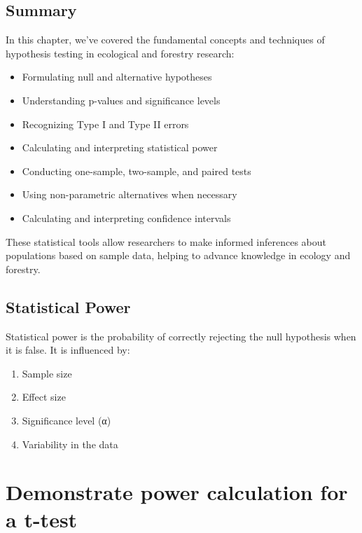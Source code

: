 \documentclass[
  letterpaper,
]{book}
\providecommand{\tightlist}{%
  \setlength{\itemsep}{0pt}\setlength{\parskip}{0pt}}
\begin{document}
\section{Summary}\label{summary-3}

In this chapter, we've covered the fundamental concepts and techniques
of hypothesis testing in ecological and forestry research:

\begin{itemize}
\tightlist
\item
  Formulating null and alternative hypotheses
\item
  Understanding p-values and significance levels
\item
  Recognizing Type I and Type II errors
\item
  Calculating and interpreting statistical power
\item
  Conducting one-sample, two-sample, and paired tests
\item
  Using non-parametric alternatives when necessary
\item
  Calculating and interpreting confidence intervals
\end{itemize}

These statistical tools allow researchers to make informed inferences
about populations based on sample data, helping to advance knowledge in
ecology and forestry.

\section{Statistical Power}\label{statistical-power-1}

Statistical power is the probability of correctly rejecting the null
hypothesis when it is false. It is influenced by:

\begin{enumerate}
\def\labelenumi{\arabic{enumi}.}
\tightlist
\item
  Sample size
\item
  Effect size
\item
  Significance level (α)
\item
  Variability in the data
\end{enumerate}

\chapter{Demonstrate power calculation for a
t-test}\label{demonstrate-power-calculation-for-a-t-test}
\end{document}
